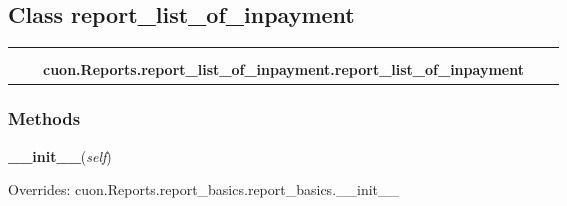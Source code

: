 \subsection{Class report\_list\_of\_inpayment}

    \label{cuon:Reports:report_list_of_inpayment:report_list_of_inpayment}
\begin{tabular}{cccccc}
\multicolumn{2}{r}{\settowidth{\BCL}{cuon.Reports.report\_basics.report\_basics}\multirow{2}{\BCL}{cuon.Reports.report\_basics.report\_basics}}
&&
  \\\cline{3-3}
  &&\multicolumn{1}{c|}{}
&&
  \\
&&\multicolumn{2}{l}{\textbf{cuon.Reports.report\_list\_of\_inpayment.report\_list\_of\_inpayment}}
\end{tabular}



  \subsubsection{Methods}

    \vspace{0.5ex}

\hspace{.8\funcindent}\begin{boxedminipage}{\funcwidth}

    \raggedright \textbf{\_\_init\_\_}(\textit{self})

\setlength{\parskip}{2ex}
\setlength{\parskip}{1ex}
      Overrides: cuon.Reports.report\_basics.report\_basics.\_\_init\_\_

    \end{boxedminipage}

    \label{cuon:Reports:report_list_of_inpayment:report_list_of_inpayment:getReportData}

    \vspace{0.5ex}

